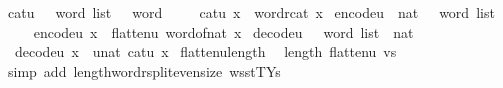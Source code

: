 \begin{isabellebody}
\isanewline
{}\isamarkupfalse%
\ cat{\isacharunderscore}{\kern0pt}u{}{}\ {\isacharcolon}{\kern0pt}{\isacharcolon}{\kern0pt}\ {\isachardoublequoteopen}{}\ word\ list\ {\isasymRightarrow}\ {}{}\ word{\isachardoublequoteclose}\isanewline
\ \ \isanewline
\ \ {\isachardoublequoteopen}cat{\isacharunderscore}{\kern0pt}u{}{}\ x\ {\isasymequiv}\ word{\isacharunderscore}{\kern0pt}rcat\ x{\isachardoublequoteclose}\isanewline
\isanewline
{}\isamarkupfalse%
\ encode{\isacharunderscore}{\kern0pt}u{}{}\ {\isacharcolon}{\kern0pt}{\isacharcolon}{\kern0pt}\ {\isachardoublequoteopen}nat\ {\isasymRightarrow}\ {}\ word\ list{\isachardoublequoteclose}\isanewline
\ \ \isanewline
\ \ {\isachardoublequoteopen}encode{\isacharunderscore}{\kern0pt}u{}{}\ x\ {\isasymequiv}\ flatten{\isacharunderscore}{\kern0pt}u{}{}\ {\isacharparenleft}{\kern0pt}word{\isacharunderscore}{\kern0pt}of{\isacharunderscore}{\kern0pt}nat\ x{\isacharparenright}{\kern0pt}{\isachardoublequoteclose}\isanewline
\isanewline
{}\isamarkupfalse%
\ decode{\isacharunderscore}{\kern0pt}u{}{}\ {\isacharcolon}{\kern0pt}{\isacharcolon}{\kern0pt}\ {\isachardoublequoteopen}{}\ word\ list\ {\isasymRightarrow}\ nat{\isachardoublequoteclose}\isanewline
\ \ \isanewline
\ \ {\isachardoublequoteopen}decode{\isacharunderscore}{\kern0pt}u{}{}\ x\ {\isasymequiv}\ unat\ {\isacharparenleft}{\kern0pt}cat{\isacharunderscore}{\kern0pt}u{}{}\ x{\isacharparenright}{\kern0pt}{\isachardoublequoteclose}\isanewline
\isanewline
{}\isamarkupfalse%
\ flatten{\isacharunderscore}{\kern0pt}u{}{}{\isacharunderscore}{\kern0pt}length{\isacharcolon}{\kern0pt}\isanewline
\ \ {\isachardoublequoteopen}length\ {\isacharparenleft}{\kern0pt}flatten{\isacharunderscore}{\kern0pt}u{}{}\ vs{\isacharparenright}{\kern0pt}\ {\isacharequal}{\kern0pt}\ {}{\isachardoublequoteclose}\isanewline
%
\isadelimproof
\ \ %
\endisadelimproof
%
\isatagproof
{}\isamarkupfalse%
\ {\isacharparenleft}{\kern0pt}simp\ add{\isacharcolon}{\kern0pt}\ length{\isacharunderscore}{\kern0pt}word{\isacharunderscore}{\kern0pt}rsplit{\isacharunderscore}{\kern0pt}even{\isacharunderscore}{\kern0pt}size\ wsst{\isacharunderscore}{\kern0pt}TYs{\isacharparenleft}{\kern0pt}{}{\isacharparenright}{\kern0pt}{\isacharparenright}{\kern0pt}%

\end{isabellebody}

